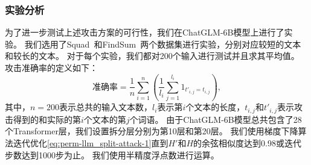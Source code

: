 \subsubsection{实验分析}
为了进一步测试上述攻击方案的可行性，我们在ChatGLM-6B模型上进行了实验。
%
我们选用了Squad~\cite{2016_squad}和FindSum~\cite{2022_findsum}两个数据集进行实验，分别对应较短的文本和较长的文本。
%
对于每个实验，我们都对200个输入进行测试并且求其平均值。
%
攻击准确率的定义如下：
\begin{equation}
    \text{准确率} = \dfrac{1}{n} \sum_{i=1}^n \left( \dfrac{1}{l_i} \sum_{j=1}^{l_i} 1_{t'_{i,j} = t_{i,j}} \right),
\end{equation}
其中，$n = 200$表示总共的输入文本数，$l_i$表示第$i$个文本的长度，$t_{i,j}$和$t'_{i,j}$表示攻击得到的和实际的第$i$个文本的第$j$个词语。
%
由于ChatGLM-6B模型总共包含了28个Transformer层，我们设置拆分层分别为第10层和第20层。
%
我们使用梯度下降算法迭代优化\autoref{eq:perm-llm_split-attack-1}直到$H'$和$H$的余弦相似度达到0.98或迭代步数达到1000步为止。
%
我们使用半精度浮点数进行运算。

